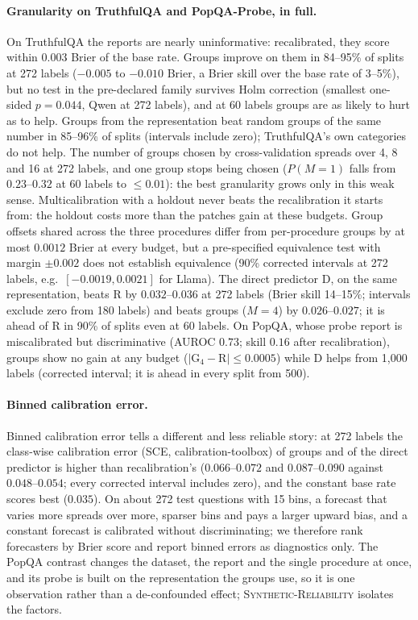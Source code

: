 \documentclass[twoside]{article}
\theoremstyle{definition}
\theoremstyle{remark}
\newcommand{\1}{\mathbf{1}}
\newcommand{\expname}[1]{\textsc{#1}}
\begin{document}
\paragraph{Granularity on TruthfulQA and PopQA-Probe, in full.}
On TruthfulQA the reports are nearly uninformative: recalibrated, they score within $0.003$ Brier of
the base rate. Groups improve on them in 84--95\% of splits at 272 labels ($-0.005$ to $-0.010$ Brier,
a Brier skill over the base rate of 3--5\%), but no test in the pre-declared family survives Holm
correction (smallest one-sided $p=0.044$, Qwen at 272 labels), and at 60 labels groups are as likely to
hurt as to help. Groups from the representation beat random groups of the same number in 85--96\% of
splits (intervals include zero); TruthfulQA's own categories do not help. The number of groups chosen by
cross-validation spreads over 4, 8 and 16 at 272 labels, and one group stops being chosen
($P(M=1)$ falls from $0.23$--$0.32$ at 60 labels to $\le0.01$): the best granularity grows only in this
weak sense. Multicalibration with a holdout never beats the recalibration it starts from: the holdout
costs more than the patches gain at these budgets. Group offsets shared across the three procedures
differ from per-procedure groups by at most $0.0012$ Brier at every budget, but a pre-specified
equivalence test with margin $\pm0.002$ does not establish equivalence (90\% corrected intervals at 272
labels, e.g.\ $[-0.0019,0.0021]$ for Llama). The direct predictor D, on the same representation,
beats R by $0.032$--$0.036$ at 272 labels (Brier skill 14--15\%; intervals exclude zero from 180 labels)
and beats groups ($M=4$) by $0.026$--$0.027$; it is ahead of R in 90\% of splits even at 60 labels. On PopQA,
whose probe report is miscalibrated but discriminative (AUROC $0.73$; skill $0.16$ after
recalibration), groups show no gain at any budget ($|$G$_4-$R$|\le0.0005$) while D helps from 1{,}000 labels (corrected
interval; it is ahead in every split from 500).

\paragraph{Binned calibration error.}
Binned calibration error tells a different and less reliable story:
at 272 labels the class-wise calibration error (SCE, calibration-toolbox) of groups and of the direct
predictor is higher than recalibration's ($0.066$--$0.072$ and $0.087$--$0.090$ against $0.048$--$0.054$;
every corrected interval includes zero), and the constant base rate scores best ($0.035$). On about 272
test questions with 15 bins, a forecast that varies more spreads over more, sparser bins and pays a
larger upward bias, and a constant forecast is calibrated without discriminating; we therefore rank
forecasters by Brier score and report binned errors as diagnostics only.
The PopQA contrast changes the dataset, the report and the single procedure at once, and its probe is
built on the representation the groups use, so it is one observation rather than a de-confounded
effect; \expname{Synthetic-Reliability} isolates the factors.
\end{document}
